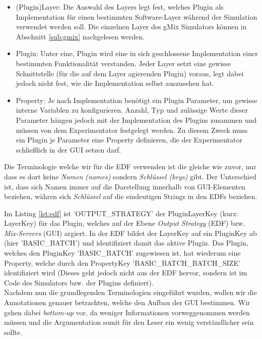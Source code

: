 \documentclass[a4paper, 11pt]{article} %
\begin{document}
\begin{itemize}
	\item (Plugin)Layer: Die Auswahl des Layers legt fest, welches Plugin als Implementation für einen bestimmten Software-Layer während der Simulation verwendet werden soll. Die einzelnen Layer des gMix Simulators können in Abschnitt \ref{sub:gmix} nachgelesen werden. 
	\item Plugin: Unter eine, Plugin wird eine in sich geschlossene Implementation einer bestimmten Funktionalität verstanden. Jeder Layer setzt eine gewisse Schnittstelle (für die auf dem Layer agierenden Plugin) voraus, legt dabei jedoch nicht fest, wie die Implementation selbst auszusehen hat.
	\item Property: Je nach Implementation benötigt ein Plugin Parameter, um gewisse interne Variablen zu konfigurieren. Anzahl, Typ und zulässige Werte dieser Parameter hängen jedoch mit der Implementation des Plugins zusammen und müssen von dem Experimentator festgelegt werden. Zu diesem Zweck muss ein Plugin je Parameter eine Property definieren, die der Experimentator schließlich in der GUI setzen darf.
\end{itemize} 

Die Terminologie welche wir für die EDF verwenden ist die gleiche wie zuvor, nur dass es dort keine \emph{Namen (names)} sondern \emph{Schlüssel (keys)} gibt. Der Unterschied ist, dass sich Namen immer auf die Darstellung innerhalb von GUI-Elementen beziehen, währen sich \emph{Schlüssel} auf die eindeutigen Strings in den EDFs beziehen.

Im Listing \ref{lst:edf} ist 'OUTPUT\_STRATEGY' der PluginLayerKey (kurz: LayerKey) für das Plugin, welches auf der Ebene \emph{Output Strategy} (EDF) bzw.  \emph{Mix-Servers} (GUI) argiert. In der EDF bildet der LayerKey auf ein PluginKey ab (hier 'BASIC\_BATCH') und identifiziert damit das aktive Plugin. Das Plugin, welches den PluginKey 'BASIC\_BATCH' zugewiesen ist, hat wiederum eine Property, welche durch den PropertyKey 'BASIC\_BATCH\_BATCH\_SIZE' identifiziert wird (Dieses geht jedoch nicht aus der EDF hervor, sondern ist im Code des Simulators bzw. der Plugins definiert).\\

Nachdem nun die grundlegenden Terminologien eingeführt wurden, wollen wir die Annotationen genauer betrachten, welche den Aufbau der GUI bestimmen. Wir gehen dabei \emph{bottom-up} vor, da weniger Informationen vorweggenommen werden müssen und die Argumentation somit für den Leser ein wenig verständlicher sein sollte.
\end{document}
